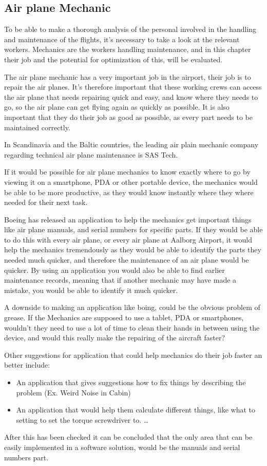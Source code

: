 \subsection{Air plane Mechanic}
To be able to make a thorough analysis of the personal involved in the handling and maintenance of the flights, it's necessary to take a look at the relevant workers. Mechanics are the workers handling maintenance, and in this chapter their job and the potential for optimization of this, will be evaluated.

The air plane mechanic has a very important job in the airport, their job is to repair the air planes. It's therefore important that these working crews can access the air plane that needs repairing quick and easy, and know where they needs to go, so the air plane can get flying again as quickly as possible. It is also important that they do their job as good as possible, as every part needs to be maintained correctly.

In Scandinavia and the Baltic countries, the leading air plain mechanic company regarding technical air plane maintenance is SAS Tech\cite{sas_tech_mechanic}.

If it would be possible for air plane mechanics to know exactly where to go by viewing it on a smartphone, PDA or other portable device, the mechanics would be able to be more productive, as they would know instantly where they where needed for their next task. 

Boeing has released an application to help the mechanics get important things like air plane manuals, and serial numbers for specific parts. If they would be able to do this with every air plane, or every air plane at Aalborg Airport, it would help the mechanics tremendously as they would be able to identify the parts they needed much quicker, and therefore the maintenance of an air plane would be quicker. By using an application you would also be able to find earlier maintenance records, meaning that if another mechanic may have made a mistake, you would be able to identify it much quicker\cite{cnet_boeing_app}.

A downside to making an application like boing, could be the obvious problem of grease. If the Mechanics are supposed to use a tablet, PDA or smartphones, wouldn't they need to use a lot of time to clean their hands in between using the device, and would this really make the repairing of the aircraft faster?

Other suggestions for application that could help mechanics do their job faster an better include:
\begin{itemize}
\item An application that gives suggestions how to fix things by describing the problem (Ex. Weird Noise in Cabin)
\item An application that would help them calculate different things, like what to setting to set the torque screwdriver to. \ldots
\end{itemize}

After this has been checked it can be concluded that the only area that can be easily implemented in a software solution, would be the manuals and serial numbers part.
